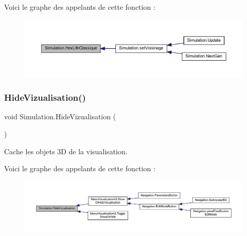Voici le graphe des appelants de cette fonction \+:\nopagebreak
\begin{figure}[H]
\begin{center}
\leavevmode
\includegraphics[width=350pt]{class_simulation_a20934920a4fc75fa258a85d0c4e6968e_icgraph}
\end{center}
\end{figure}
\mbox{\label{class_simulation_a71a9e0a93e05353ff243f4c48afa67d0}} 
\subsubsection{\texorpdfstring{Hide\+Vizualisation()}{HideVizualisation()}}
{\footnotesize\ttfamily void Simulation.\+Hide\+Vizualisation (\begin{DoxyParamCaption}{ }\end{DoxyParamCaption})\hspace{0.3cm}{\ttfamily [inline]}}



Cache les objets 3D de la visualisation. 

Voici le graphe des appelants de cette fonction \+:
\nopagebreak
\begin{figure}[H]
\begin{center}
\leavevmode
\includegraphics[width=350pt]{class_simulation_a71a9e0a93e05353ff243f4c48afa67d0_icgraph}
\end{center}
\end{figure}
\mbox{\label{class_simulation_aad224ef6c13fac45281cf6c095c5c874}} 
